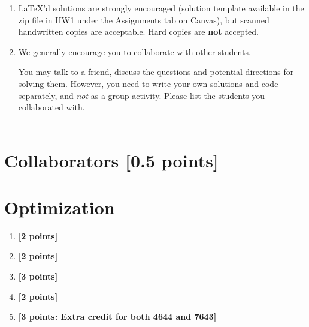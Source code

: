 \documentclass[11pt,english]{article}
\begin{document}
\begin{enumerate}
\item
     \LaTeX'd solutions are strongly encouraged (solution template
     available in the zip file in HW1 under the Assignments tab on Canvas), but scanned handwritten copies are acceptable. Hard copies are \textbf{not} accepted.


\item We generally encourage you to collaborate with other students.

You may talk to a friend,
discuss the questions and potential directions for solving them. However, you need to write
your own solutions and code separately, and \emph{not} as a group activity.
Please list the students you collaborated with. \\ \\

\end{enumerate}
\newpage


\section{Collaborators [0.5 points]}




\section{Optimization}

\begin{enumerate}[start]

\item
\textbf{[2 points]}


\item
\textbf{[2 points]}


\item
\textbf{[3 points]}


\item
\textbf{[2 points]}


\item
\textbf{[3 points: Extra credit for both 4644 and 7643]}


\end{enumerate}
\end{document}

